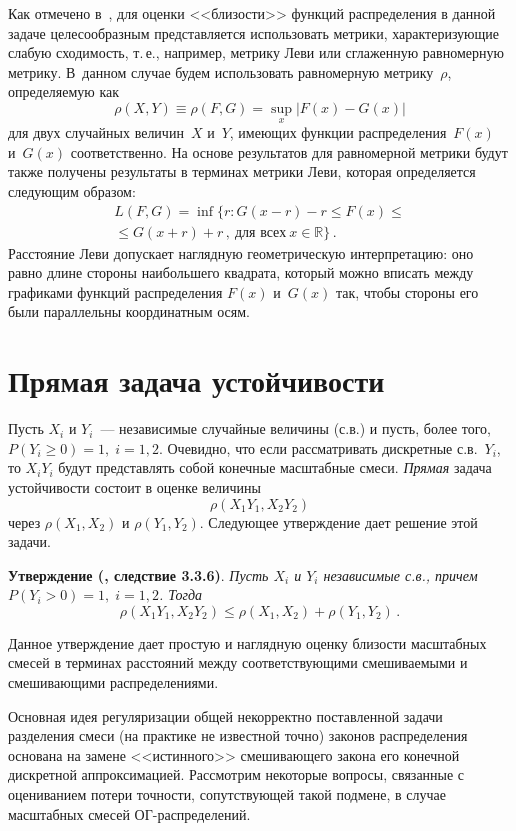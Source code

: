 \begin{multicols}{2}
Как отмечено в~\cite{Korolev2007s}, для оценки <<близости>>
функций распределения в данной задаче целесообразным
представляется использовать мет\-ри\-ки, характеризующие слабую
сходимость, т.\,е., например, мет\-ри\-ку Леви или сглаженную
равномерную мет\-ри\-ку. В~данном случае будем использовать
равномерную мет\-ри\-ку~$\rho$, определяемую как
$$
\rho(X,Y) \equiv \rho(F,G) = \sup\limits_{x}|F(x)-G(x)|
$$
для двух случайных величин~$X$ и~$Y$, имеющих функции
распределения~$F(x)$ и~$G(x)$ соответственно. На основе
результатов для равномерной метрики будут также получены
результаты в терминах метрики Леви, которая определяется следующим
образом:
\begin{multline*}
L(F, G) = \inf\{r: G(x-r)-r \leqslant F(x) \leqslant{}\\
{}\leqslant G(x+r)+r\,, \ \mbox{для всех}\ x\in{\mathbb R}\}\,.
\end{multline*}
Расстояние Леви допускает наглядную геометрическую интерпретацию:
оно равно длине стороны наибольшего квадрата, который можно
вписать между графиками функций распределения $F(x)$ и~$G(x)$ так,
чтобы стороны его были параллельны координатным осям.

\section{Прямая задача устойчивости}

Пусть $X_i$ и $Y_i$~--- независимые случайные величины (с.в.) и
пусть, более того, $P(Y_i\geqslant0)=1,\; i=1,2$. Очевидно, что
если рассматривать дискретные с.в.\ $Y_i$, то $X_iY_i$ будут
представлять собой конечные масштабные смеси. {\it Прямая} задача
устойчивости состоит в оценке величины
$$
\rho(X_1Y_1, X_2Y_2)
$$
через $\rho(X_1,X_2)$ и $\rho(Y_1,Y_2)$. Следующее утверждение
дает решение этой задачи.

\medskip

\noindent
\textbf{Утверждение (\cite{Korolev2007s}, следствие 3.3.6)}.
\textit{Пусть $X_i$ и $Y_i$ независимые с.в., причем $P(Y_i>0)=1,\;
i=1,2$. Тогда}
$$
\rho(X_1Y_1, X_2Y_2) \leqslant \rho(X_1,X_2) + \rho(Y_1,Y_2)\,.
$$

\smallskip

Данное утверждение дает простую и наглядную оценку близости
масштабных смесей в терминах расстояний между соответствующими
смешиваемыми и смешивающими распределениями.

Основная идея регуляризации общей некорректно поставленной задачи
разделения смеси (на практике не известной точно) законов
распределения основана на замене <<истинного>> смешивающего закона
его конечной дискретной аппроксимацией. Рассмотрим некоторые
вопросы, связанные с оцениванием потери точности, сопутствующей
такой подмене, в случае масштабных смесей ОГ-рас\-пре\-де\-лений.


\end{multicols}
